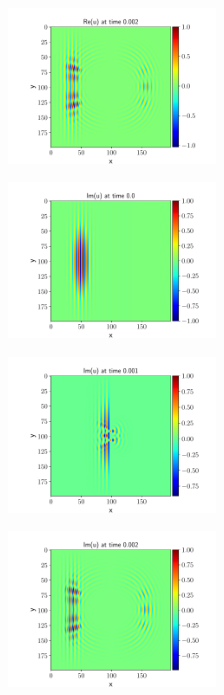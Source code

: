 \documentclass[english,notitlepage,reprint,nofootinbib]{revtex4-2}  %
\begin{document}
	\begin{figure}[h!]
		\centering
		\includegraphics[trim={1cm 0cm 1cm 0cm},clip,width=0.49\textwidth]{figures/real_plot_0.002.pdf}
		\caption{}
		\label{fig:prob8_Re2}
	\end{figure}

	\begin{figure}[h!]
		\centering
		\includegraphics[trim={1cm 0cm 1cm 0cm},clip,width=0.49\textwidth]{figures/im_plot_0.0.pdf}
		\caption{}
		\label{fig:prob8_Im0}
	\end{figure}
	
	\begin{figure}[h!]
		\centering
		\includegraphics[trim={1cm 0cm 1cm 0cm},clip,width=0.49\textwidth]{figures/im_plot_0.001.pdf}
		\caption{}
		\label{fig:prob8_Im1}
	\end{figure}
	
	\begin{figure}[h!]
		\centering
		\includegraphics[trim={1cm 0cm 1cm 0cm},clip,width=0.49\textwidth]{figures/im_plot_0.002.pdf}
		\caption{}
		\label{fig:prob8_Im2}
	\end{figure}
\end{document}
